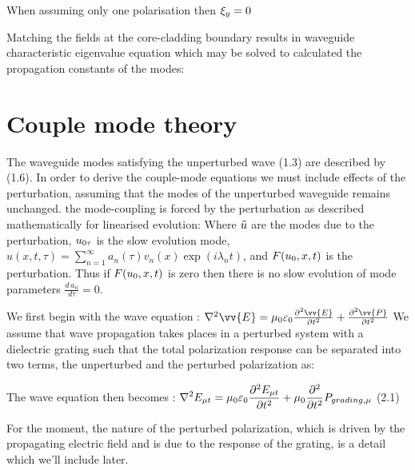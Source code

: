 \documentclass[11pt, openright]{book}
\begin{document}
        When assuming only one polarisation then $\displaystyle{\xi_y} =0$
        
        Matching the fields at the core-cladding boundary results in waveguide characteristic eigenvalue equation which may be solved to calculated the propagation constants of the modes: 

         \section*{Couple mode theory}

         The waveguide modes satisfying the unperturbed wave (1.3) are described by (1.6). In order to derive the couple-mode equations we must include effects of the perturbation, assuming that the modes of the unperturbed waveguide remains unchanged. the mode-coupling is forced by the perturbation as described mathematically for linearised evolution: 
         Where $\displaystyle{\tilde{u}}$ are the modes due to the perturbation, $\displaystyle{u_{0\tau}}$ is the slow evolution mode,\\ ${u(x,t,\tau)=\sum_{n=1}^{\infty} a_n(\tau)v_n(x)\exp(i\lambda_nt)}$, and $\displaystyle{F(u_0,x,t)}$ is the perturbation. Thus if $\displaystyle{F(u_0,x,t)}$ is zero then there is no slow evolution of mode parameters $\frac{d\,a_n}{d\tau} = 0$.    

         We first begin with the wave equation : ${\nabla^2  \vv{E} = \mu_0\varepsilon_0 \frac{\partial^{2} \vv{E}}{\partial t^{2}} + \frac{\partial^{2} \vv{P}}{\partial t^{2}}   }$
         We assume that wave propagation takes places in a perturbed system with a dielectric grating such that the total polarization response can be separated into two terms, the unperturbed and the perturbed polarization as: 

         The wave equation then becomes : $\displaystyle{\nabla^2E_{\mu t}= \mu_0\varepsilon_0 \frac{\partial^{2} E_{\mu t}}{\partial t^{2}} + \mu_0 \frac{\partial^{2} }{\partial t^{2}}  P_{grading,\mu}}$ \hfill (2.1)
         
         For the moment, the nature of the perturbed polarization, which is driven by the propagating electric field and is due to the response of the grating, is a detail which we'll include later. 
\end{document}
